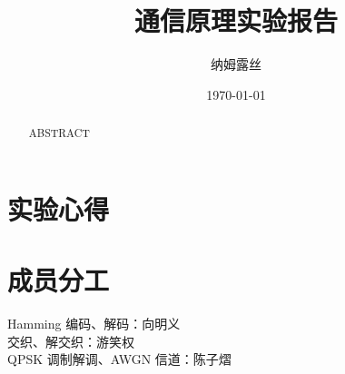 \documentclass[a4paper]{article}  %
\begin{document}
\title{\textbf{通信原理实验报告}}
\author{纳姆露丝}
\date{\today}
\maketitle

\tableofcontents

\newpage

\begin{abstract}
    ABSTRACT
\end{abstract}









\section{实验心得}

\section{成员分工}

Hamming 编码、解码：向明义 \\
交织、解交织：游笑权 \\
QPSK 调制解调、AWGN 信道：陈子熠




\end{document}
